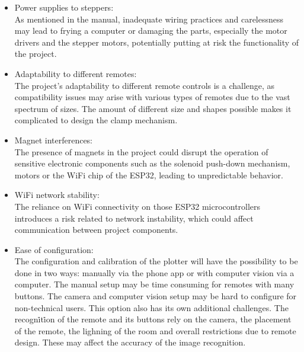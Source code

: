 \begin{itemize}
    \item Power supplies to steppers:\\
        As mentioned in the manual, inadequate wiring practices and carelessness may lead to frying a computer or damaging the parts, especially the motor drivers and the stepper motors, potentially putting at risk the functionality of the project.
    \item Adaptability to different remotes:\\
        The project's adaptability to different remote controls is a challenge, as compatibility issues may arise with various types of remotes due to the vast spectrum of sizes. The amount of different size and shapes possible makes it complicated to design the clamp mechanism. 
    \item Magnet interferences:\\
        The presence of magnets in the project could disrupt the operation of sensitive electronic components such as the solenoid push-down mechanism, motors or the WiFi chip of the ESP32, leading to unpredictable behavior.
    \item WiFi network stability:\\
        The reliance on WiFi connectivity on those ESP32 microcontrollers introduces a risk related to network instability, which could affect communication between project components.
    \item Ease of configuration:\\
        The configuration and calibration of the plotter will have the possibility to be done in two ways: manually via the phone app or with computer vision via a computer. The manual setup may be time consuming for remotes with many buttons. 
        The camera and computer vision setup may be hard to configure for non-technical users. This option also has its own additional challenges. The recogni̇ti̇on of the remote and its buttons rely on the camera, the placement of the remote, the lighning of the room
        and overall restrictions due to remote design. These may affect the accuracy of the image recognition.
\end{itemize}

